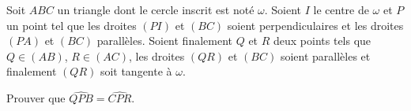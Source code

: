 Soit $ABC$ un triangle dont le cercle inscrit est noté $\omega$. Soient $I$ le centre de $\omega$ et $P$ un point tel que les droites $(PI)$ et $(BC)$ soient perpendiculaires et les droites $(PA)$ et $(BC)$ parallèles. Soient finalement $Q$ et $R$ deux points tels que $Q \in (AB)$, $R \in (AC)$, les droites $(QR)$ et $(BC)$ soient parallèles et finalement $(QR)$ soit tangente à $\omega$.

Prouver que $\widehat{QPB} = \widehat{CPR}$.